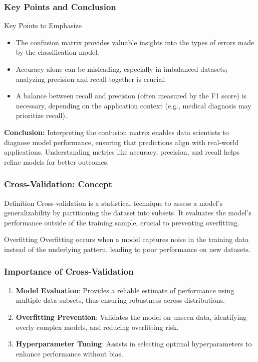 \documentclass[aspectratio=169]{beamer}
\begin{document}
\begin{frame}[fragile]
    \frametitle{Key Points and Conclusion}
    \begin{block}{Key Points to Emphasize}
        \begin{itemize}
            \item The confusion matrix provides valuable insights into the types of errors made by the classification model.
            \item Accuracy alone can be misleading, especially in imbalanced datasets; analyzing precision and recall together is crucial.
            \item A balance between recall and precision (often measured by the F1 score) is necessary, depending on the application context (e.g., medical diagnosis may prioritize recall).
        \end{itemize}
    \end{block}
    
    \textbf{Conclusion:} Interpreting the confusion matrix enables data scientists to diagnose model performance, ensuring that predictions align with real-world applications. Understanding metrics like accuracy, precision, and recall helps refine models for better outcomes.
\end{frame}

\begin{frame}[fragile]
    \frametitle{Cross-Validation: Concept}
    \begin{block}{Definition}
        Cross-validation is a statistical technique to assess a model's generalizability by partitioning the dataset into subsets. It evaluates the model's performance outside of the training sample, crucial to preventing overfitting.
    \end{block}

    \begin{block}{Overfitting}
        Overfitting occurs when a model captures noise in the training data instead of the underlying pattern, leading to poor performance on new datasets.
    \end{block}
\end{frame}

\begin{frame}[fragile]
    \frametitle{Importance of Cross-Validation}
    \begin{enumerate}
        \item \textbf{Model Evaluation}: Provides a reliable estimate of performance using multiple data subsets, thus ensuring robustness across distributions.
        \item \textbf{Overfitting Prevention}: Validates the model on unseen data, identifying overly complex models, and reducing overfitting risk.
        \item \textbf{Hyperparameter Tuning}: Assists in selecting optimal hyperparameters to enhance performance without bias.
    \end{enumerate}
\end{frame}
\end{document}
